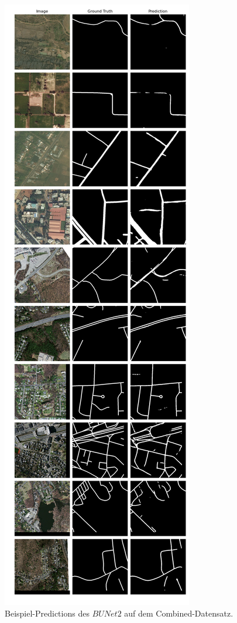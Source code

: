 \begin{figure}
	\centering
	\includegraphics[width=.41\textwidth]{Bilder/Samples-Combined/bunet2.png}
	\caption{Beispiel-Predictions des $BUNet2$ auf dem Combined-Datensatz.}
	\label{fig:combined-samples-bunet2}
\end{figure}

